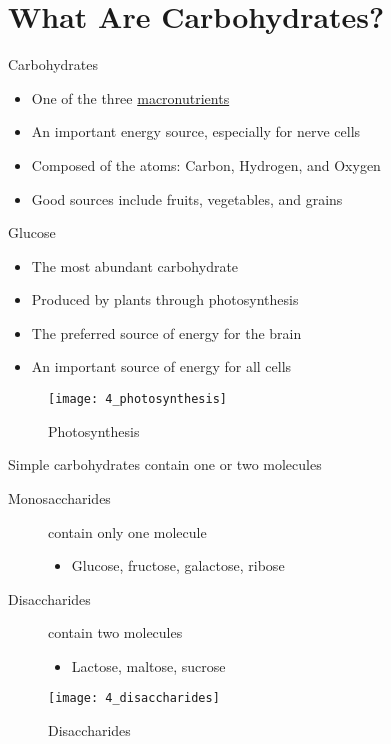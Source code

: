 \documentclass[title={Chapter 4}]{fdsn201notes}
\begin{document}
\maketitle
\setcounter{chapter}{4}

\section{What Are Carbohydrates?}\label{sec:what-are-carbohydrates?}
Carbohydrates
\begin{itemize}
	\item One of the three \hyperref[dfn:macronutrients]{macronutrients}
	\item An important energy source, especially for nerve cells
	\item Composed of the atoms: Carbon, Hydrogen, and Oxygen
	\item Good sources include fruits, vegetables, and grains
\end{itemize}

Glucose
\begin{itemize}
	\item The most abundant carbohydrate
	\item Produced by plants through photosynthesis
	\item The preferred source of energy for the brain
	\item An important source of energy for all cells
\end{itemize}

\begin{figure}[H]
	\centering
	\texttt{[image: 4\_photosynthesis]}
	\caption{Photosynthesis}
	\label{fig:photosynthesis}
\end{figure}

Simple carbohydrates contain one or two molecules
\begin{description}
	\item[Monosaccharides] contain only one molecule
	\begin{itemize}
		\item Glucose, fructose, galactose, ribose
	\end{itemize}
	\item[Disaccharides] contain two molecules
	\begin{itemize}
		\item Lactose, maltose, sucrose
	\end{itemize}
\end{description}

\begin{figure}[H]
	\centering
	\texttt{[image: 4\_disaccharides]}
	\caption{Disaccharides}
	\label{fig:disaccharides}
\end{figure}
\end{document}
